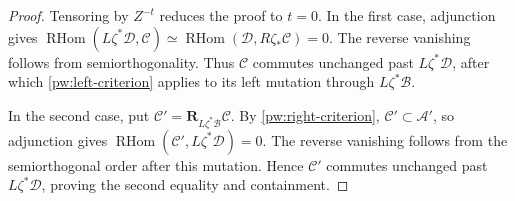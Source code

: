 \documentclass[11pt,letterpaper]{amsart}
\theoremstyle{plain}
\theoremstyle{definition}
\theoremstyle{remark}
\numberwithin{equation}{section}
\begin{document}
\begin{proof}
Tensoring by $Z^{-t}$ reduces the proof to $t=0$.
In the first case, adjunction gives
$
 \operatorname{RHom}(L\zeta^*\mathcal D,\mathcal C)
 \simeq\operatorname{RHom}(\mathcal D,R\zeta_*\mathcal C)=0$.
The reverse vanishing follows from semiorthogonality. Thus $\mathcal C$
commutes unchanged past $L\zeta^*\mathcal D$, after which
\eqref{pw:left-criterion} applies to its left mutation through
$L\zeta^*\mathcal B$.

In the second case, put
$\mathcal C'=\mathbf R_{L\zeta^*\mathcal B}\mathcal C$.
By \eqref{pw:right-criterion}, $\mathcal C'\subset\mathcal A'$, so
adjunction gives
$\operatorname{RHom}(\mathcal C',L\zeta^*\mathcal D)=0$.
The reverse vanishing follows from the semiorthogonal order after this
mutation. Hence $\mathcal C'$ commutes unchanged past
$L\zeta^*\mathcal D$, proving the second equality and containment.
\end{proof}
\end{document}
